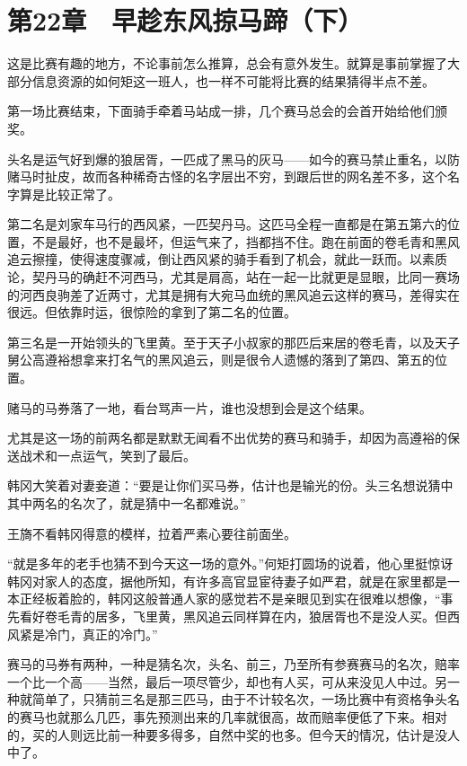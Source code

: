 \section{第22章　早趁东风掠马蹄（下）}

这是比赛有趣的地方，不论事前怎么推算，总会有意外发生。就算是事前掌握了大部分信息资源的如何矩这一班人，也一样不可能将比赛的结果猜得半点不差。

第一场比赛结束，下面骑手牵着马站成一排，几个赛马总会的会首开始给他们颁奖。

头名是运气好到爆的狼居胥，一匹成了黑马的灰马——如今的赛马禁止重名，以防赌马时扯皮，故而各种稀奇古怪的名字层出不穷，到跟后世的网名差不多，这个名字算是比较正常了。

第二名是刘家车马行的西风紧，一匹契丹马。这匹马全程一直都是在第五第六的位置，不是最好，也不是最坏，但运气来了，挡都挡不住。跑在前面的卷毛青和黑风追云擦撞，使得速度骤减，倒让西风紧的骑手看到了机会，就此一跃而。以素质论，契丹马的确赶不河西马，尤其是肩高，站在一起一比就更是显眼，比同一赛场的河西良驹差了近两寸，尤其是拥有大宛马血统的黑风追云这样的赛马，差得实在很远。但依靠时运，很惊险的拿到了第二名的位置。

第三名是一开始领头的飞里黄。至于天子小叔家的那匹后来居的卷毛青，以及天子舅公高遵裕想拿来打名气的黑风追云，则是很令人遗憾的落到了第四、第五的位置。

赌马的马券落了一地，看台骂声一片，谁也没想到会是这个结果。

尤其是这一场的前两名都是默默无闻看不出优势的赛马和骑手，却因为高遵裕的保送战术和一点运气，笑到了最后。

韩冈大笑着对妻妾道：“要是让你们买马券，估计也是输光的份。头三名想说猜中其中两名的名次了，就是猜中一名都难说。”

王旖不看韩冈得意的模样，拉着严素心要往前面坐。

“就是多年的老手也猜不到今天这一场的意外。”何矩打圆场的说着，他心里挺惊讶韩冈对家人的态度，据他所知，有许多高官显宦待妻子如严君，就是在家里都是一本正经板着脸的，韩冈这般普通人家的感觉若不是亲眼见到实在很难以想像，“事先看好卷毛青的居多，飞里黄，黑风追云同样算在内，狼居胥也不是没人买。但西风紧是冷门，真正的冷门。”

赛马的马券有两种，一种是猜名次，头名、前三，乃至所有参赛赛马的名次，赔率一个比一个高——当然，最后一项尽管少，却也有人买，可从来没见人中过。另一种就简单了，只猜前三名是那三匹马，由于不计较名次，一场比赛中有资格争头名的赛马也就那么几匹，事先预测出来的几率就很高，故而赔率便低了下来。相对的，买的人则远比前一种要多得多，自然中奖的也多。但今天的情况，估计是没人中了。

